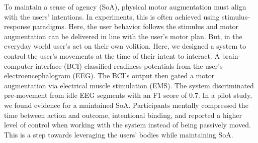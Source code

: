 
To maintain a sense of agency (SoA), physical motor augmentation must align with the users' intentions. In experiments, this is often achieved using stimulus-response paradigms. Here, the user behavior follows the stimulus and motor augmentation can be delivered in line with the user's motor plan. But, in the everyday world user's act on their own volition. Here, we designed a system to control the user's movements at the time of their intent to interact. A brain-computer interface (BCI) classified readiness potentials from the user's electroencephalogram (EEG). The BCI's output then gated a motor augmentation via electrical muscle stimulation (EMS). The system discriminated pre-movement from idle EEG segments with an F1 score of 0.7. In a pilot study, we found evidence for a maintained SoA. Participants mentally compressed the time between action and outcome, intentional binding, and reported a higher level of control when working with the system instead of being passively moved. This is a step towards leveraging the users’ bodies while maintaining SoA.